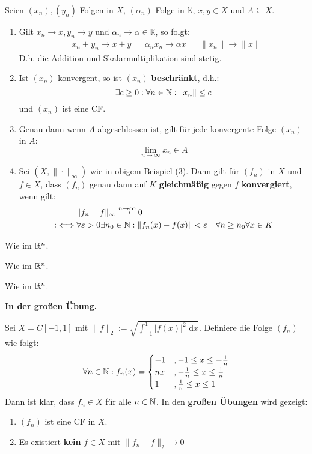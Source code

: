 \documentclass[a4paper,twoside,DIV15,BCOR12mm,chapterprefix=true,headings=twolinechapter]{scrbook}
\begin{document}
\begin{satz}
Seien $(x_n),(y_n)$ Folgen in $X$, $(\alpha_n)$ Folge in $\mathbb{K}$, $x,y\in X$ und
$A\subseteq X$.
\begin{enumerate}
\item Gilt $x_n\to x,y_n\to y$ und $\alpha_n\to\alpha\in\mathbb{K}$, so folgt:
\begin{align*}
&x_n+y_n\to x+y& &\alpha_n x_n\to\alpha x& &\|x_n\|\to\|x\|
\end{align*}
D.h. die Addition und Skalarmultiplikation sind stetig.
\item Ist $(x_n)$ konvergent, so ist $(x_n)$ \textbf{beschränkt}, d.h.:
\[\exists c\ge 0:\forall n\in\mathbb{N}:\|x_n\|\le c\]
und $(x_n)$ ist eine CF.
\item Genau dann wenn $A$ abgeschlossen ist, gilt für jede konvergente Folge $(x_n)$ in $A$:
\[\lim_{n\to\infty}x_n\in A\]
\item Sei $(X,\|\cdot\|_\infty)$ wie in obigem Beispiel (3). Dann gilt für
$(f_n)$ in $X$ und $f\in X$, dass $(f_n)$ genau dann auf $K$ \textbf{gleichmäßig} gegen $f$ 
\textbf{konvergiert}, wenn gilt:
\begin{align*}
&\|f_n-f\|_\infty \stackrel{n\to\infty}{\to}0\\
:\iff &\forall\varepsilon>0\exists n_0\in\mathbb{N}:\|f_n(x)-f(x)\|<\varepsilon\quad \forall n\ge n_0\forall x\in K
\end{align*}
\end{enumerate}
\end{satz}

\begin{beweise}
\item Wie im $\mathbb{R}^n$.
\item Wie im $\mathbb{R}^n$.
\item Wie im $\mathbb{R}^n$.
\item \textbf{\color{red}In der großen Übung.}
\end{beweise}

\begin{beispiel}
Sei $X=C[-1,1]$ mit $\|f\|_2:=\sqrt{\int_{-1}^1 |f(x)|^2\text{ d}x}$. Definiere die
Folge $(f_n)$ wie folgt:
\[\forall n\in\mathbb{N}: f_n(x)=
\begin{cases}
-1&,-1\le x\le -\frac1n\\
nx&,-\frac1n\le x\le \frac1n\\
1&,\frac1n\le x\le 1
\end{cases}\]
Dann ist klar, dass $f_n\in X$ für alle $n\in\mathbb{N}$. In den \textbf{\color{red}großen Übungen} wird gezeigt:
\begin{enumerate}
\item $(f_n)$ ist eine CF in $X$.
\item Es existiert \textbf{kein} $f\in X$ mit $\|f_n-f\|_2\to 0$
\end{enumerate}
\end{beispiel}
\end{document}
